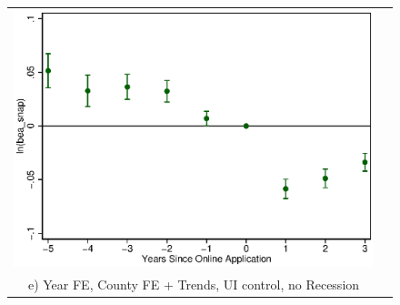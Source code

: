 \documentclass[11pt,letterpaper]{article}
\begin{document}
\begin{figure}
\begin{tabular}{cc}
\includegraphics[scale=0.57]{tabfig/evstu_bea_snap_one_yrcfcttrunor_5_3}\\
e) Year FE, County FE + Trends, UI control, no Recession\\
\end{tabular}
\end{figure}
\end{document}
